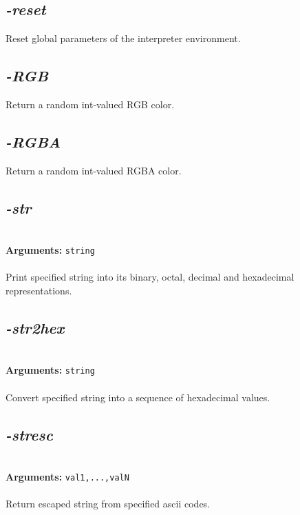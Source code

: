 \documentclass[a4paper,11pt,twoside]{book}
\begin{document}
\subsection{\emph{-reset} }\vspace*{-0.5em}
Reset global parameters of the interpreter environment.


\subsection{\emph{-RGB} }\vspace*{-0.5em}
Return a random int-valued RGB color.


\subsection{\emph{-RGBA} }\vspace*{-0.5em}
Return a random int-valued RGBA color.


\subsection{\emph{-str} }\vspace*{-0.5em}
~\\\textbf{Arguments: } 
{\small \texttt{string}}\\~\\
Print specified string into its binary, octal, decimal and hexadecimal representations.


\subsection{\emph{-str2hex} }\vspace*{-0.5em}
~\\\textbf{Arguments: } 
{\small \texttt{string}}\\~\\
Convert specified string into a sequence of hexadecimal values.


\subsection{\emph{-stresc} }\vspace*{-0.5em}
~\\\textbf{Arguments: } 
{\small \texttt{val1,...,valN}}\\~\\
Return escaped string from specified ascii codes.
\end{document}

